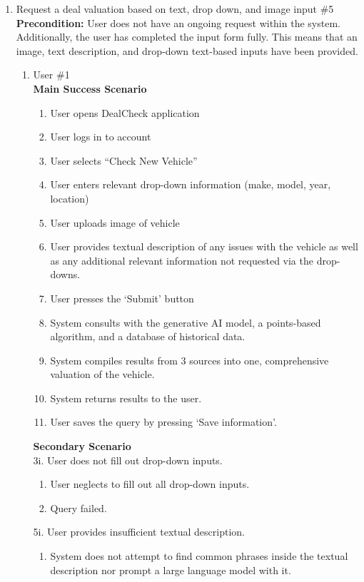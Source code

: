 \documentclass[]{article}
\begin{document}
\begin{enumerate}
\begin{enumerate}[{\bf {BE}1.}]
	\item Request a deal valuation based on text, drop down, and image input \#5 \\

	{\bf Precondition:} User does not have an ongoing request within the system. Additionally, 
	the user has completed the input form fully. This means that an image, 
	text description, and drop-down text-based inputs have been provided.
	\begin{enumerate}[{\bf VP1.}]
		\item User \#1 \\
		{\bf Main Success Scenario}
		\begin{enumerate}[1.]
			\item User opens DealCheck application
			\item User logs in to account
			\item User selects “Check New Vehicle”
			\item User enters relevant drop-down information (make, model, year, location)
			\item User uploads image of vehicle
			\item User provides textual description of any issues with the vehicle as well as any additional relevant information not requested via the drop-downs.
			\item User presses the ‘Submit’ button
			\item System consults with the generative AI model, a points-based algorithm, and a database of historical data.
			\item System compiles results from 3 sources into one, comprehensive valuation of the vehicle.
			\item System returns results to the user.
			\item User saves the query by pressing ‘Save information’.
		\end{enumerate}
		{\bf Secondary Scenario} \\
		3i. User does not fill out drop-down inputs.
		\begin{enumerate}[{3i}.1]
			\item User neglects to fill out all drop-down inputs.
			\item Query failed.
		\end{enumerate}
		5i. User provides insufficient textual description.
		\begin{enumerate}[{5i}.1]
			\item System does not attempt to find common phrases inside the textual description nor prompt a large language model with it.

\end{enumerate}
\end{enumerate}
\end{enumerate}
\end{enumerate}
\end{document}
